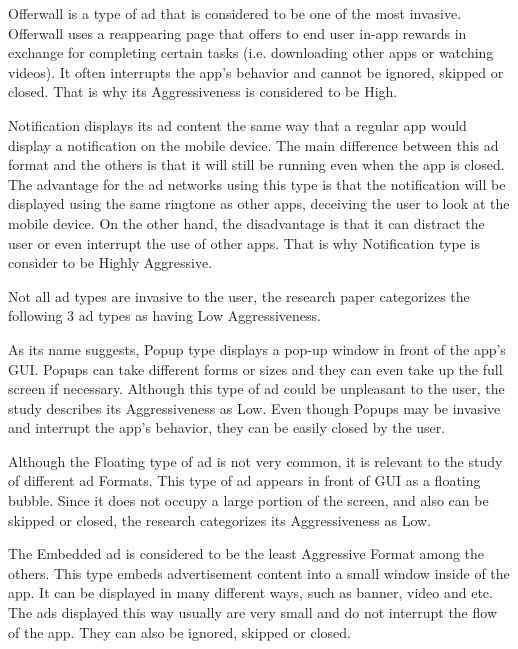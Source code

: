 \documentclass[conference]{IEEEtran}
\begin{document}
Offerwall is a type of ad that is considered to be one of the most invasive. Offerwall uses a reappearing page that offers to end user in-app rewards in exchange for completing certain tasks (i.e. downloading other apps or watching videos). It often interrupts the app’s behavior and cannot be ignored, skipped or closed. That is why its Aggressiveness is considered to be High. 

Notification displays its ad content the same way that a regular app would display a notification on the mobile device. The main difference between this ad format and the others is that it will still be running even when the app is closed. The advantage for the ad networks using this type is that the notification will be displayed using the same ringtone as other apps, deceiving the user to look at the mobile device. On the other hand, the disadvantage is that it can distract the user or even interrupt the use of other apps. That is why Notification type is consider to be Highly Aggressive.

Not all ad types are invasive to the user, the research paper categorizes the following 3 ad types as having Low Aggressiveness.

As its name suggests, Popup type displays a pop-up window in front of the app’s GUI. Popups can take different forms or sizes and they can even take up the full screen if necessary. Although this type of ad could be unpleasant to the user, the study describes its Aggressiveness as Low. Even though Popups may be invasive and interrupt the app’s behavior, they can be easily closed by the user. 

Although the Floating type of ad is not very common, it is relevant to the study of different ad Formats. This type of ad appears in front of GUI as a floating bubble. Since it does not occupy a large portion of the screen, and also can be skipped or closed, the research categorizes its Aggressiveness as Low. 

The Embedded ad is considered to be the least Aggressive Format among the others. This type embeds advertisement content into a small window inside of the app. It can be displayed in many different ways, such as banner, video and etc. The ads displayed this way usually are very small and do not interrupt the flow of the app. They can also be ignored, skipped or closed.
\end{document}
